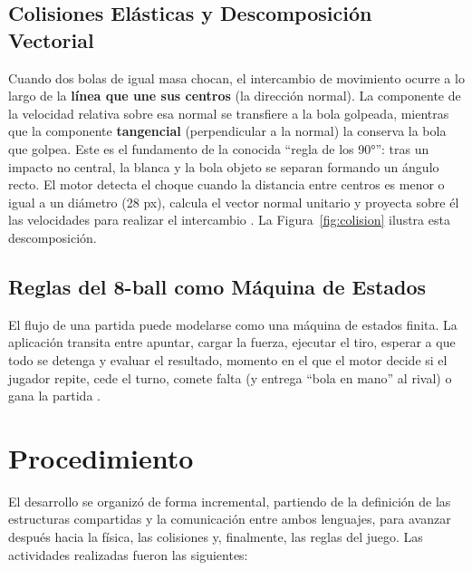\documentclass[a4paper,12pt]{article}
\begin{document}
\subsection{Colisiones Elásticas y Descomposición Vectorial}
Cuando dos bolas de igual masa chocan, el intercambio de movimiento ocurre a lo largo de la \textbf{línea que une sus centros} (la dirección normal). La componente de la velocidad relativa sobre esa normal se transfiere a la bola golpeada, mientras que la componente \textbf{tangencial} (perpendicular a la normal) la conserva la bola que golpea. Este es el fundamento de la conocida ``regla de los \ang{90}'': tras un impacto no central, la blanca y la bola objeto se separan formando un ángulo recto. El motor detecta el choque cuando la distancia entre centros es menor o igual a un diámetro (\num{28} px), calcula el vector normal unitario y proyecta sobre él las velocidades para realizar el intercambio \cite{stallings2019computer}. La Figura~\ref{fig:colision} ilustra esta descomposición.

\subsection{Reglas del 8-ball como Máquina de Estados}
El flujo de una partida puede modelarse como una máquina de estados finita. La aplicación transita entre apuntar, cargar la fuerza, ejecutar el tiro, esperar a que todo se detenga y evaluar el resultado, momento en el que el motor decide si el jugador repite, cede el turno, comete falta (y entrega ``bola en mano'' al rival) o gana la partida \cite{tanenbaum2013structured}.

\section{Procedimiento}
El desarrollo se organizó de forma incremental, partiendo de la definición de las estructuras compartidas y la comunicación entre ambos lenguajes, para avanzar después hacia la física, las colisiones y, finalmente, las reglas del juego. Las actividades realizadas fueron las siguientes:
\end{document}
